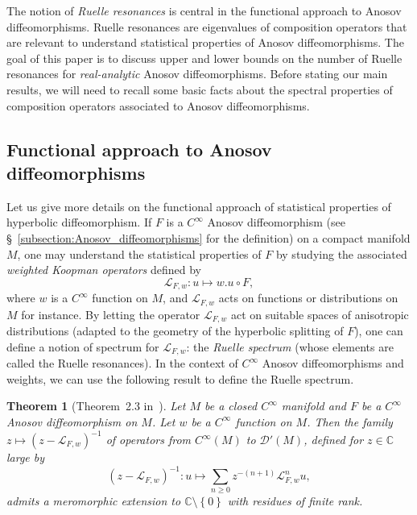 \documentclass[10pt]{amsart}
\newtheorem{theo}{Theorem}[section]
\theoremstyle{definition}\newtheorem{defi}[theo]{Definition}\newtheorem{rema}[theo]{Remark}\newtheorem{exam}[theo]{Example}\newtheorem{exem}[theo]{Example}\newtheorem{nota}[theo]{Notation}
\newcommand{\set}[1]{\left\{ #1 \right\}}
\newcommand{\clL}{\mathcal{L}}
\newcommand{\clD}{\mathcal{D}}
\newcommand{\bbC}{\mathbb{C}}
\begin{document}
The notion of \emph{Ruelle resonances} is central in the functional approach to Anosov diffeomorphisms. Ruelle resonances are eigenvalues of composition operators that are relevant to understand statistical properties of Anosov diffeomorphisms. The goal of this paper is to discuss upper and lower bounds on the number of Ruelle resonances for \emph{real-analytic} Anosov diffeomorphisms. Before stating our main results, we will need to recall some basic facts about the spectral properties of composition operators associated to Anosov diffeomorphisms.

\subsection{Functional approach to Anosov diffeomorphisms}

Let us give more details on the functional approach of statistical properties of hyperbolic diffeomorphism. If $F$ is a $C^\infty$ Anosov diffeomorphism (see \S~\ref{subsection:Anosov_diffeomorphisms} for the definition) on a compact manifold $M$, one may understand the statistical properties of $F$ by studying the associated \emph{weighted Koopman operators} defined by
\begin{equation}\label{eq:def_Koopman}
\clL_{F,w} : u \mapsto w. u \circ F,
\end{equation}
where $w$ is a $C^\infty$ function on $M$, and $\clL_{F,w}$ acts on functions or distributions on $M$ for instance. By letting the operator $\clL_{F,w}$ act on suitable spaces of anisotropic distributions (adapted to the geometry of the hyperbolic splitting of $F$), one can define a notion of spectrum for $\clL_{F,w}$: the \emph{Ruelle spectrum} (whose elements are called the Ruelle resonances). In the context of $C^\infty$ Anosov diffeomorphisms and weights, we can use the following result to define the Ruelle spectrum.

\begin{theo}[Theorem~2.3 in~\cite{gouezel_liverani_1}]\label{theorem:resonances}
Let $M$ be a closed $C^\infty$ manifold and $F$ be a $C^\infty$ Anosov diffeomorphism on $M$. Let $w$ be a $C^\infty$ function on $M$. Then the family $z \mapsto (z - \clL_{F,w})^{-1}$ of operators from $C^\infty(M)$ to $\clD'(M)$, defined for $z \in \bbC$ large by
\begin{equation*}
(z - \clL_{F,w})^{-1} : u \mapsto \sum_{n\geq0} z^{-(n+1)} \clL_{F,w}^n u,
\end{equation*}
admits a meromorphic extension to $\bbC \setminus \set{0}$ with residues of finite rank.
\end{theo}
\end{document}
